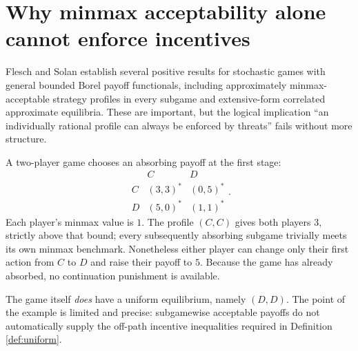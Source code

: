 \documentclass[11pt,a4paper]{article}
\theoremstyle{definition}
\theoremstyle{remark}
\begin{document}
\section{Why minmax acceptability alone cannot enforce incentives}\label{sec:minmax}
Flesch and Solan \cite{fleschsolan2023} establish several positive results for stochastic games with general bounded Borel payoff functionals, including approximately minmax-acceptable strategy profiles in every subgame and extensive-form correlated approximate equilibria. These are important, but the logical implication ``an individually rational profile can always be enforced by threats'' fails without more structure.

A two-player game chooses an absorbing payoff at the first stage:
\[
\begin{array}{c|cc}
 & C&D\\\hline
C&(3,3)^*&(0,5)^*\\
D&(5,0)^*&(1,1)^*
\end{array}.
\]
Each player's minmax value is $1$. The profile $(C,C)$ gives both players $3$, strictly above that bound; every subsequently absorbing subgame trivially meets its own minmax benchmark. Nonetheless either player can change only their first action from $C$ to $D$ and raise their payoff to $5$. Because the game has already absorbed, no continuation punishment is available.

The game itself \emph{does} have a uniform equilibrium, namely $(D,D)$. The point of the example is limited and precise: subgamewise acceptable payoffs do not automatically supply the off-path incentive inequalities required in Definition \ref{def:uniform}.
\end{document}
